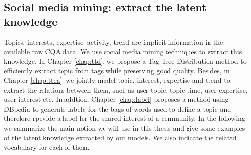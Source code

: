 

\subsection{Social media mining: extract the latent knowledge}

Topics, interests, expertise, activity, trend are implicit information in the available raw CQA data. We use social media mining techniques to extract this knowledge.
In Chapter \ref{chap:ttd}, we propose a Tag Tree Distribution method to efficiently extract topic from tags while preserving good quality. Besides, in Chapter \ref{chap:ttea}, we jointly model topic, interest, expertise and trend to extract the relations between them, such as user-topic, topic-time, user-expertise, user-interest etc. In addtion, Chapter \ref{chap:label} proposes a method using DBpedia to generate labelq for the bags of words  used to define a topic and therefore rpovide a label for the shared interest of a community. 
In the following we sammarize the main notion we will use in this thesis and give some examples of the latent knowledge extracted by our models. We also indicate the related vocabulary for each of them.

